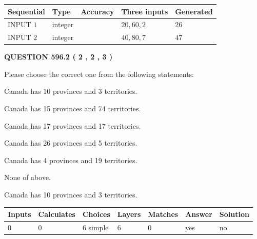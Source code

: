 \documentclass[12pt]{article}
\begin{document}
  
\noindent\begin{tabular}{|l|l|l|l|l|}
\hline
 Sequential & Type & Accuracy & Three inputs & Generated \\ 
\hline
 
 
  INPUT $  1 $ & integer &  & $
 20
 , 
 60
 , 
 2
 $ & $ 26 $ 
 \\  \hline  
 
 
  INPUT $  2 $ & integer &  & $
 40
 , 
 80
 , 
 7
 $ & $ 47 $ 
 \\  \hline  
 \end{tabular}
   
   
  
\vspace{0.2in}
  
{\textbf{\Large{QUESTION
596.2 
 ( 2 , 2 , 3 )
}}}
  
  
Please choose the correct one from the following statements:
 
 
Canada has 10  provinces and 3 territories.
 
 
Canada has  15 provinces and  74 territories.
 
 
Canada has  17 provinces and  17 territories.
 
 
Canada has  26 provinces and  5 territories.
 
 
Canada has   4 provinces and  19 territories.
 
 
 None of above.
 
 
\noindent{}
 
 
Canada has 10  provinces and 3 territories.
 
 
\noindent{}
 
 
   
   
   
   
\noindent\begin{tabular}{|l|l|l|l|l|l|l|}
 \hline
Inputs & Calculates & Choices & Layers & Matches & Answer & Solution \\ \hline
 0  & 
 0  & 
 6
  simple  
  & 
 6  & 
 0  & 
  yes & 
  no 
  \\ \hline
 \end{tabular}
   
\end{document}
